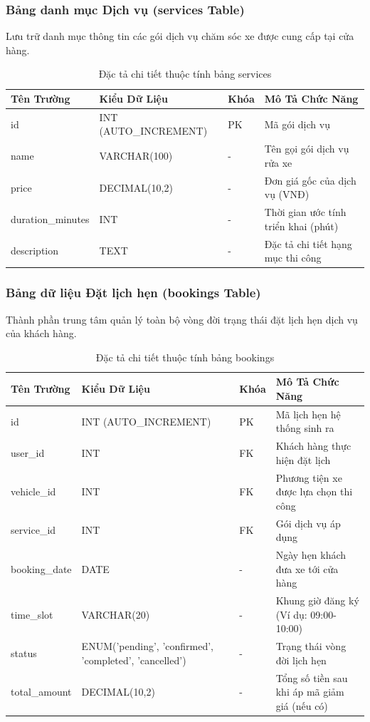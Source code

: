 \subsubsection{Bảng danh mục Dịch vụ (services Table)}
Lưu trữ danh mục thông tin các gói dịch vụ chăm sóc xe được cung cấp tại cửa hàng.
\begin{table}[htbp]
\centering
\caption{Đặc tả chi tiết thuộc tính bảng services}
\label{tab:services_schema}
\small
\begin{tabular}{p{2.9cm}p{4.2cm}p{1.3cm}p{4.9cm}}
\toprule
\textbf{Tên Trường} & \textbf{Kiểu Dữ Liệu} & \textbf{Khóa} & \textbf{Mô Tả Chức Năng} \\
\midrule
id & INT (AUTO\_INCREMENT) & PK & Mã gói dịch vụ \\
name & VARCHAR(100) & - & Tên gọi gói dịch vụ rửa xe \\
price & DECIMAL(10,2) & - & Đơn giá gốc của dịch vụ (VNĐ) \\
duration\_minutes & INT & - & Thời gian ước tính triển khai (phút) \\
description & TEXT & - & Đặc tả chi tiết hạng mục thi công \\
\bottomrule
\end{tabular}
\end{table}

\subsubsection{Bảng dữ liệu Đặt lịch hẹn (bookings Table)}
Thành phần trung tâm quản lý toàn bộ vòng đời trạng thái đặt lịch hẹn dịch vụ của khách hàng.
\begin{table}[htbp]
\centering
\caption{Đặc tả chi tiết thuộc tính bảng bookings}
\label{tab:bookings_schema}
\small
\begin{tabular}{p{2.9cm}p{4.2cm}p{1.3cm}p{4.9cm}}
\toprule
\textbf{Tên Trường} & \textbf{Kiểu Dữ Liệu} & \textbf{Khóa} & \textbf{Mô Tả Chức Năng} \\
\midrule
id & INT (AUTO\_INCREMENT) & PK & Mã lịch hẹn hệ thống sinh ra \\
user\_id & INT & FK & Khách hàng thực hiện đặt lịch \\
vehicle\_id & INT & FK & Phương tiện xe được lựa chọn thi công \\
service\_id & INT & FK & Gói dịch vụ áp dụng \\
booking\_date & DATE & - & Ngày hẹn khách đưa xe tới cửa hàng \\
time\_slot & VARCHAR(20) & - & Khung giờ đăng ký (Ví dụ: 09:00-10:00) \\
status & ENUM('pending', 'confirmed', 'completed', 'cancelled') & - & Trạng thái vòng đời lịch hẹn \\
total\_amount & DECIMAL(10,2) & - & Tổng số tiền sau khi áp mã giảm giá (nếu có) \\
\bottomrule
\end{tabular}
\end{table}

